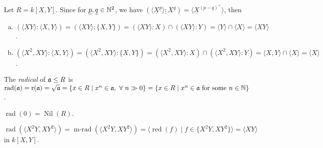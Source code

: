\begin{example}
    Let $R = k[X,Y]$. Since for $\underline p,\underline q \in \mathbb{N}^2$, we have $(\langle \underline X^{\underline p} \rangle\underline: X^{\underline q}) = \langle \underline X^{(p-q)^+} \rangle$, then
    \begin{enumerate}[(a)]
        \item $(\langle XY \rangle: \langle X,Y \rangle) = (\langle XY \rangle: \{X,Y\}) = (\langle XY \rangle: X) \cap (\langle XY \rangle : Y) = \langle Y \rangle \cap \langle X \rangle = \langle XY \rangle$.
        \item $(\langle X^2,XY \rangle: \langle X,Y \rangle) = (\langle X^2,XY \rangle: \{X,Y\}) = (\langle X^2,XY \rangle:X) \cap (\langle X^2,XY \rangle: Y) = \langle X,Y \rangle \cap \langle X \rangle = \langle X \rangle$.
    \end{enumerate}
\end{example}

\begin{definition}
    The \emph{radical} of $\mathfrak{a} \leq R$ is $\operatorname{rad}(\mathfrak{a}) = \operatorname{r}(\mathfrak{a}) = \sqrt {\mathfrak{a}} = \{x \in R \mid x^n \in \mathfrak{a}, \ \forall \  n \gg 0\} = \{x \in R \mid x^n \in \mathfrak{a} \text{ for some }n \in \mathbb{N}\}$. 
\end{definition}

\begin{remark}
    $\operatorname{rad}(0) = \operatorname{Nil}(R)$.
\end{remark}

\begin{example}
    $\operatorname{rad}(\langle X^2Y,XY^2 \rangle) = \operatorname{m-rad}(\langle X^2Y,XY^2 \rangle) = \langle \operatorname{red}(f) \mid f \in \{X^2Y,XY^2\} \rangle = \langle XY \rangle$ in $k[X,Y]$.
\end{example}

